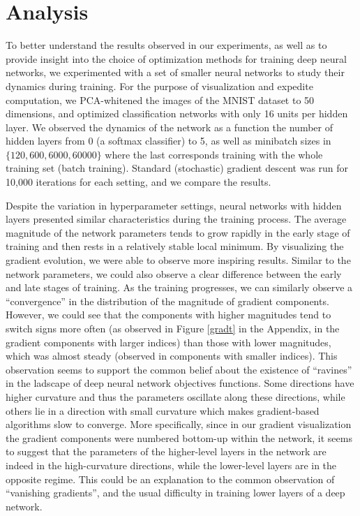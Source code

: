 \section{Analysis}

To better understand the results observed in our experiments, as well as to
provide insight into the choice of optimization methods for training deep
neural networks, we experimented with a set of smaller neural networks to study
their dynamics during training. For the purpose of visualization and expedite
computation, we PCA-whitened the images of the MNIST dataset to 50 dimensions,
and optimized classification networks with only  16 units per hidden layer. We
observed the dynamics of the network as a function the number of hidden layers
from 0 (a softmax classifier) to 5, as well as minibatch sizes in $\{120, 600,
6000, 60000\}$ where the last corresponds training with the whole training set
(batch training). Standard (stochastic) gradient descent was run for 10,000
iterations for each setting, and we compare the results.

Despite the variation in hyperparameter settings, neural networks with hidden
layers presented similar characteristics during the training process. The
average magnitude of the network parameters tends to grow rapidly in the early
stage of training and then rests in a relatively stable local minimum. By
visualizing the gradient evolution, we were able to observe more inspiring
results. Similar to the network parameters, we could also observe a clear
difference between the early and late stages of training. As the training
progresses, we can similarly observe a ``convergence'' in the distribution of
the magnitude of gradient components. However, we could see that the components
with higher magnitudes tend to switch signs more often (as observed in Figure
\ref{gradt} in the Appendix, in the gradient components with larger indices) than
those with lower magnitudes, which was almost steady (observed in components
with smaller indices). This observation seems to support the common belief
about the existence of ``ravines'' in the ladscape of deep neural network
objectives functions.  Some directions have higher curvature and thus the
parameters oscillate along these directions, while others lie in a direction
with small curvature which makes gradient-based algorithms slow to converge.
More specifically, since in our gradient visualization the gradient components
were numbered bottom-up within the network, it seems to suggest that the
parameters of the higher-level layers in the network are indeed in the
high-curvature directions, while the lower-level layers are in the opposite
regime. This could be an explanation to the common observation of ``vanishing
gradients'', and the usual difficulty in training lower layers of a deep
network.

